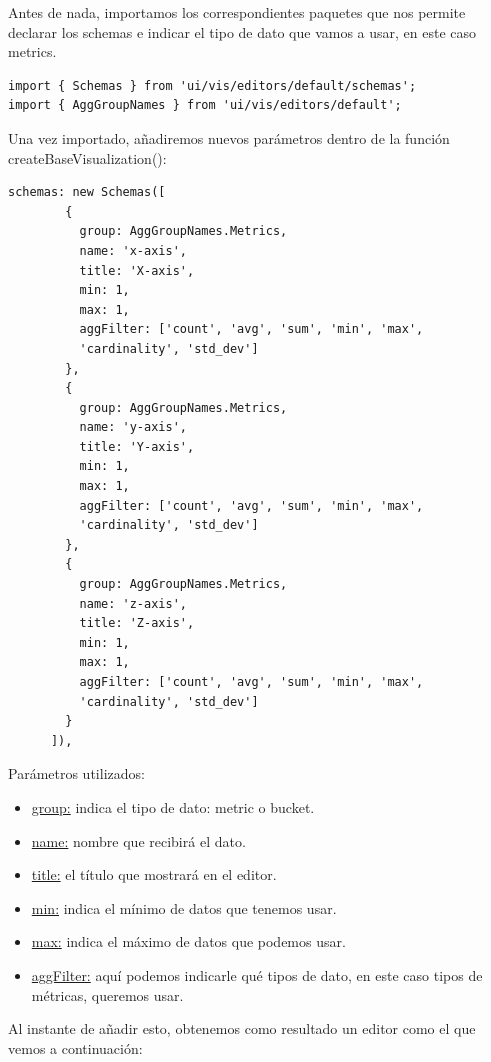 \documentclass[a4paper, 12pt]{book}
\begin{document}
Antes de nada, importamos los correspondientes paquetes que nos permite declarar los schemas e indicar el tipo de dato que vamos a usar, en este caso metrics.

\begin{lstlisting}[frame=single]
import { Schemas } from 'ui/vis/editors/default/schemas';
import { AggGroupNames } from 'ui/vis/editors/default';
\end{lstlisting}

Una vez importado, añadiremos nuevos parámetros dentro de la función createBaseVisualization():

\begin{lstlisting}[frame=single]
schemas: new Schemas([
        {
          group: AggGroupNames.Metrics,
          name: 'x-axis',
          title: 'X-axis',
          min: 1,
          max: 1,
          aggFilter: ['count', 'avg', 'sum', 'min', 'max', 
          'cardinality', 'std_dev']
        },
        {
          group: AggGroupNames.Metrics,
          name: 'y-axis',
          title: 'Y-axis',
          min: 1,
          max: 1,
          aggFilter: ['count', 'avg', 'sum', 'min', 'max', 
          'cardinality', 'std_dev']
        },
        {
          group: AggGroupNames.Metrics,
          name: 'z-axis',
          title: 'Z-axis',
          min: 1,
          max: 1,
          aggFilter: ['count', 'avg', 'sum', 'min', 'max', 
          'cardinality', 'std_dev']
        }
      ]),
\end{lstlisting}

Parámetros utilizados:
\begin{itemize}
    \item \underline{group:} indica el tipo de dato: metric o bucket.
    \item \underline{name:} nombre que recibirá el dato.
    \item \underline{title:} el título que mostrará en el editor.
    \item \underline{min:} indica el mínimo de datos que tenemos usar.
    \item \underline{max:} indica el máximo de datos que podemos usar.
    \item \underline{aggFilter:} aquí podemos indicarle qué tipos de dato, en este caso tipos de métricas, queremos usar.
\end{itemize}

Al instante de añadir esto, obtenemos como resultado un editor como el que vemos a continuación:
\end{document}
